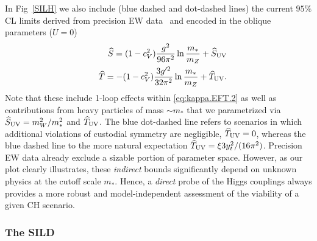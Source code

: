 In Fig~\ref{SILH} we also include (blue dashed and dot-dashed lines) the current $95\%$ CL limits derived from precision EW data~\cite{Baak:2014ora} and encoded in the oblique parameters ($U=0$)
\begin{eqnarray}
&&{\widehat S}=(1-c_V^2)\frac{g^2}{96\pi^2}\ln\frac{m_*}{m_Z}+{\widehat S}_{\rm UV}%
\\\nonumber
&&{\widehat T}=-(1-c_V^2)\frac{3g'^2}{32\pi^2}\ln\frac{m_*}{m_Z}+{\widehat T}_{\rm UV}.%
\end{eqnarray}
Note that these include 1-loop effects within \eqref{eq:kappa.EFT.2} as well as contributions from heavy particles of mass $\sim m_*$ that we parametrized via $\widehat S_{\rm UV}={m_W^2}/{m_*^2}$ and $\widehat T_{\rm UV}$. The blue dot-dashed line refers to scenarios in which additional violations of custodial symmetry are negligible, $\widehat T_{\rm UV}=0$, whereas the blue dashed line to the more natural expectation $\widehat T_{\rm UV}=\xi 3y_t^2/(16\pi^2)$. Precision EW data already exclude a sizable portion of parameter space. However, as our plot clearly illustrates, these {\emph{indirect}} bounds significantly depend on unknown physics at the cutoff scale $m_*$. Hence, a {\emph{direct}} probe of the Higgs couplings always provides a more robust and model-independent assessment of the viability of a given CH scenario.








\subsubsection{The SILD}

